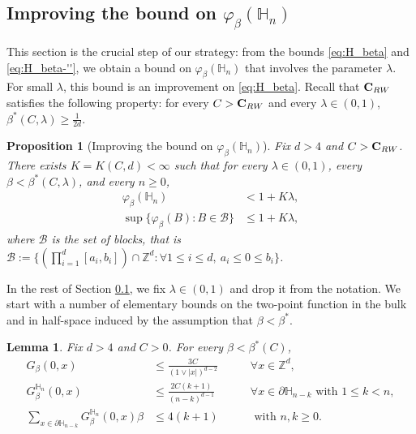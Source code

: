 \documentclass[11pt,a4paper]{article}
\numberwithin{equation}{section}
\theoremstyle{plain}
\newtheorem{Lem}[Thm]{Lemma}
\newtheorem{Prop}[Thm]{Proposition}
\theoremstyle{definition}
\newcommand\bfC{\mathbf{C}}
\begin{document}
\subsection{Improving the bound on $\varphi_\beta(\mathbb H_n)$}\label{sec:improvingphiwsaw}

This section is the crucial step of our strategy: from the bounds \eqref{eq:H_beta} and \eqref{eq:H_beta-''}, we obtain a bound on $\varphi_\beta(\mathbb H_n)$ that involves the parameter $\lambda$. For small $\lambda$, this bound is an improvement on \eqref{eq:H_beta}. Recall that $\bfC_{\rm RW}$ satisfies the following property: for every $C>\bfC_{\rm RW}$ and every $\lambda\in (0,1)$, $\beta^*(C,\lambda)\geq \tfrac{1}{2d}$.

\begin{Prop}[Improving the bound on $\varphi_\beta(\mathbb H_n)$]\label{prop:bound phi}
Fix $d>4$ and $C>\bfC_{\rm RW}$. There exists $K=K(C,d)<\infty$ such that for every $\lambda\in (0,1)$, every $\beta<\beta^*(C,\lambda)$, and every $n\ge0$, 
\begin{align}
\varphi_\beta(\mathbb H_n)&<1+K\lambda,\\
\sup\{\varphi_\beta(B):B\in \mathcal B\}&\le 1+K\lambda\label{eq:bound varphi box wsaw},
\end{align}
where $\mathcal B$ is the set of blocks, that is $\mathcal B:=\{(\prod_{i=1}^d [a_i,b_i])\cap \mathbb Z^d: \forall 1\leq i \leq d,\: a_i\leq 0\leq b_i \}$.
\end{Prop}

In the rest of Section \ref{sec:improvingphiwsaw}, we fix $\lambda\in (0,1)$ and drop it from the notation. We start with a number of elementary bounds on the two-point function in the bulk and in half-space induced by the assumption that $\beta<\beta^*$.
\begin{Lem}\label{lem: full plane 2pt function out of halfplane one}Fix $d>4$ and $C>0$. For every $\beta<\beta^*(C)$, 
\begin{align}\label{eq: full plane estimate from half plane}
    G_\beta(0,x)&\le \frac{3C}{(1\vee|x|)^{d-2}}\qquad&\forall x\in \mathbb Z^d,\\ \label{eq: half plane at distance $k$ from half space}
    G_\beta^{\mathbb H_n}(0,x)&\le \frac{2C(k+1)}{(n-k)^{d-1}}\qquad&\forall x\in \partial\mathbb H_{n-k}\text{ with }1\le k<n,\\ \label{eq: sum at distance k from halfplane}
    \sum_{x\in \partial\mathbb H_{n-k}}G_\beta^{\mathbb H_n}(0,x)\beta&\le 4(k+1)\qquad&\text{ with }n,k\ge0.
\end{align}
\end{Lem}
\end{document}
